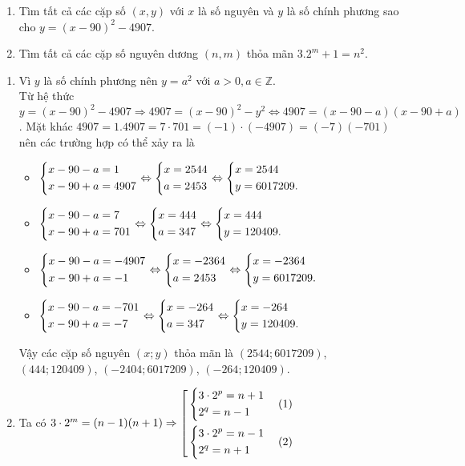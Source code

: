 \begin{ex}%
	\begin{enumerate}
		\item Tìm tất cả các cặp số $(x,y)$ với $x$ là số nguyên và $y$ là số chính phương sao cho $y=(x-90)^2-4907$.
		\item Tìm tất cả các cặp số nguyên dương $(n,m)$ thỏa mãn $3.2^m+1=n^2$.
	\end{enumerate}
	\loigiai
	{
		\begin{enumerate}
			\item Vì $y$ là số chính phương nên $y=a^2$ với $a>0,a\in \mathbb{Z}$.\\
			Từ hệ thức $y=(x-90)^2-4907\Rightarrow 4907=(x-90)^2-y^2\Leftrightarrow 4907=(x-90-a)(x-90+a)$.
			Mặt khác $4907=1.4907=7\cdot 701=(-1)\cdot (-4907)=(-7)(-701)$ nên các trường hợp có thể xảy ra là
			\begin{itemize}
				\item $\left\{\begin{aligned}&x-90-a=1\\&x-90+a=4907\end{aligned}\right.\Leftrightarrow \left\{\begin{aligned}&x=2544\\&a=2453\end{aligned}\right.\Leftrightarrow \left\{\begin{aligned}&x=2544\\&y=6017209.\end{aligned}\right.$
				\item $\left\{\begin{aligned}&x-90-a=7\\&x-90+a=701\end{aligned}\right.\Leftrightarrow \left\{\begin{aligned}&x=444\\&a=347\end{aligned}\right.\Leftrightarrow \left\{\begin{aligned}&x=444\\&y=120409.\end{aligned}\right.$
				\item $\left\{\begin{aligned}&x-90-a=-4907\\&x-9 0+a=-1\end{aligned}\right.\Leftrightarrow \left\{\begin{aligned}&x=-2364\\&a=2453\end{aligned}\right.\Leftrightarrow \left\{\begin{aligned}&x=-2364\\&y=6017209.\end{aligned}\right.$
				\item $\left\{\begin{aligned}&x-90-a=-701\\&x-90+a=-7\end{aligned}\right.\Leftrightarrow \left\{\begin{aligned}&x=-264\\&a=347\end{aligned}\right.\Leftrightarrow \left\{\begin{aligned}&x=-264\\&y=120409.\end{aligned}\right.$
			\end{itemize}
			Vậy các cặp số nguyên $(x;y)$ thỏa mãn là $(2544;6017209)$, $(444;120409)$, $(-2404;6017209)$, $(-264;120409)$.
			\item Ta có $3\cdot 2^m=(n-1)(n+1)\Rightarrow \left[\begin{aligned}&\left\{\begin{aligned}&3\cdot 2^p=n+1\\&2^q=n-1\end{aligned}\right.\quad(1)\\&\left\{\begin{aligned}&3\cdot 2^p=n-1\\&2^q=n+1\end{aligned}\right.\quad(2)\end{aligned}\right.$

\end{enumerate}}
\end{ex}
